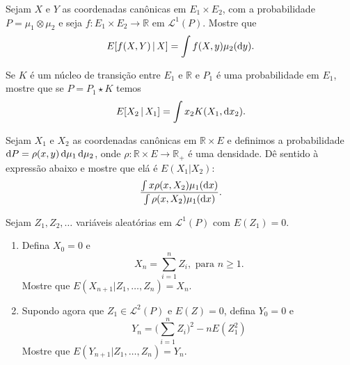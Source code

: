 \begin{exercise}
  Sejam $X$ e $Y$ as coordenadas canônicas em $E_1 \times E_2$, com a probabilidade $P = \mu_1 \otimes \mu_2$ e seja $f:E_1 \times E_2 \to \mathbb{R}$
  em $\mathcal{L}^1(P)$.
  Mostre que
  \begin{equation}
     E[ f(X,Y) \,| \, X] = \int f(X, y) \mu_2(\mathop{}\!\mathrm{d} y).
  \end{equation}
\end{exercise}

\begin{exercise}
  Se $K$ é um núcleo de transição entre $E_1$ e $\mathbb{R}$ e $P_1$ é uma probabilidade em $E_1$, mostre que se $P=P_1 \star K$ temos
  \begin{equation}
    E[ X_2 \, | \, X_1] = \int x_2 K(X_1, \mathop{}\!\mathrm{d} x_2).
  \end{equation}
\end{exercise}


\begin{exercise}
  Sejam $X_1$ e $X_2$ as coordenadas canônicas em $\mathbb{R} \times E$ e definimos a probabilidade $\mathop{}\!\mathrm{d} P = \rho(x,y) \mathop{}\!\mathrm{d} \mu_1 \mathop{}\!\mathrm{d} \mu_2$, onde $\rho:\mathbb{R} \times E \to \mathbb{R}_+$ é uma densidade.
  Dê sentido à expressão abaixo e mostre que elá é $E(X_1|X_2)$:
  \begin{equation}
     \frac{\int x\rho(x, X_2) \mu_1(\mathop{}\!\mathrm{d} x)}{\int \rho(x, X_2) \mu_1(\mathop{}\!\mathrm{d} x)}.
  \end{equation}
\end{exercise}




\begin{exercise}
  Sejam $Z_1, Z_2, \dots$ variáveis aleatórias \iid em $\mathcal{L}^1(P)$ com $E(Z_1) = 0$.
  \begin{enumerate}[\quad a)]
  \item Defina $X_0 = 0$ e
    \begin{equation}
      X_n = \sum_{i = 1}^n Z_i, \text{ para $n \geq 1$.}
    \end{equation}
    Mostre que $E(X_{n + 1} | Z_1, \dots, Z_n) = X_n$.
  \item Supondo agora que $Z_1 \in \mathcal{L}^2(P)$ e $E(Z) = 0$, defina $Y_0 = 0$ e
    \begin{equation}
      Y_n = \Big( \sum_{i = 1}^n Z_i \Big)^2 - n E(Z_1^2)
    \end{equation}
    Mostre que $E(Y_{n + 1} | Z_1, \dots, Z_n) = Y_n$.
  \end{enumerate}
\end{exercise}


